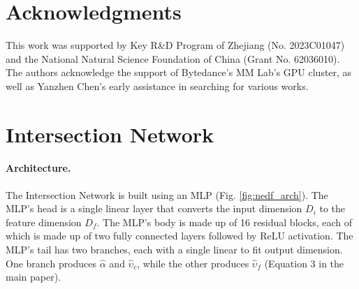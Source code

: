 \documentclass[letterpaper]{article} %
\begin{document}
\section{Acknowledgments}
This work was supported by Key R\&D Program of Zhejiang (No. 2023C01047) and the National Natural Science Foundation of China (Grant No. 62036010). The authors acknowledge the support of Bytedance's MM Lab's GPU cluster, as well as Yanzhen Chen's early assistance in searching for various works. 















\appendixpage

\section{Intersection Network}

\paragraph{Architecture.} The Intersection Network is built using an MLP (Fig. \ref{fig:nedf_arch}). The MLP's head is a single linear layer that converts the input dimension $D_i$ to the feature dimension $D_f$. The MLP's body is made up of 16 residual blocks, each of which is made up of two fully connected layers followed by ReLU activation. The MLP's tail has two branches, each with a single linear to fit output dimension. One branch produces $\hat{\alpha}$ and $\hat{\upsilon}_c$, while the other produces $\hat{\upsilon}_f$ (Equation 3 in the main paper).
\end{document}
